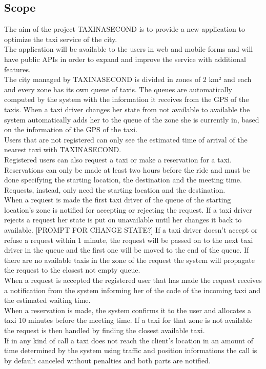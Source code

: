 \documentclass{article}
\begin{document}
\subsection{Scope}
The aim of the project TAXINASECOND is to provide a new application to optimize the taxi service of the city. 
\\The application will be available to the users in web and mobile forms and will have public APIs in order to expand and improve the service with additional features.
\\The city managed by TAXINASECOND is divided in zones of 2 km² and each and every zone has its own queue of taxis. The queues are automatically computed by the system with the information it receives from the GPS of the taxis. When a taxi driver changes her state from not available to available the system automatically adds her to the queue of the zone she is currently in, based on the information of the GPS of the taxi. 
\\Users that are not registered can only see the estimated time of arrival of the nearest taxi with TAXINASECOND.\@
\\Registered users can also request a taxi or make a reservation for a taxi. Reservations can only be made at least two hours before the ride and must be done specifying the starting location, the destination and the meeting time. Requests, instead, only need the starting location and the destination.
\\When a request is made the first taxi driver of the queue of the starting location’s zone is notified for accepting or rejecting the request. If a taxi driver rejects a request her state is put on unavailable until her changes it back to available. [PROMPT FOR CHANGE STATE?] If a taxi driver doesn’t accept or refuse a request within 1 minute, the request will be passed on to the next taxi driver in the queue and the first one will be moved to the end of the queue. If there are no available taxis in the zone of the request the system will propagate the request to the closest not empty queue.
\\When a request is accepted the registered user that has made the request receives a notification from the system informing her of the code of the incoming taxi and the estimated waiting time.
\\When a reservation is made, the system confirms it to the user and allocates a taxi 10 minutes before the meeting time. If a taxi for that zone is not available the request is then handled by finding the closest available taxi. 
\\If in any kind of call a taxi does not reach the client’s location in an amount of time determined by the system using traffic and position informations the call is by default canceled without penalties and both parts are notified.
\end{document}
